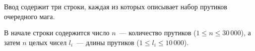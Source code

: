 Ввод содержит три строки, каждая из которых описывает набор прутиков очередного мага.

В начале строки содержится число $n$~--- количество прутиков ($1 \leq n \leq 30\,000$), а затем $n$ целых чисел $l_{i}$~--- длины прутиков ($1 \leq l_{i} \leq 10\,000$).